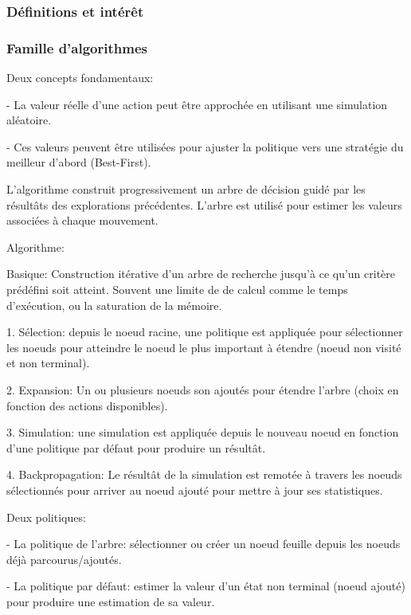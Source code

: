 \subsubsection{Définitions et intérêt}

\subsubsection{Famille d'algorithmes}
Deux concepts fondamentaux:

- La valeur réelle d'une action peut être approchée en utilisant une simulation aléatoire.

- Ces valeurs peuvent être utilisées pour ajuster la politique vers une stratégie du meilleur d'abord (Best-First).

L'algorithme construit progressivement un arbre de décision guidé par les résultâts des explorations précédentes.
L'arbre est utilisé pour estimer les valeurs associées à chaque mouvement.

Algorithme: 

Basique: Construction itérative d'un arbre de recherche jusqu'à ce qu'un critère prédéfini soit atteint. Souvent une limite de de calcul comme le temps d'exécution, ou la saturation de la mémoire.

1. Sélection: depuis le noeud racine, une politique est appliquée pour sélectionner les noeuds pour atteindre le noeud le plus important à étendre (noeud non visité et non terminal).

2. Expansion: Un ou plusieurs noeuds son ajoutés pour étendre l'arbre (choix en fonction des actions disponibles).

3. Simulation: une simulation est appliquée depuis le nouveau noeud en fonction d'une politique par défaut pour produire un résultât.

4. Backpropagation: Le résultât de la simulation est remotée à travers les noeuds sélectionnés pour arriver au noeud ajouté pour mettre à jour ses statistiques.

Deux politiques: 

- La politique de l'arbre: sélectionner ou créer un noeud feuille depuis les noeuds déjà parcourus/ajoutés.

- La politique par défaut: estimer la valeur d'un état non terminal (noeud ajouté) pour produire une estimation de sa valeur.


